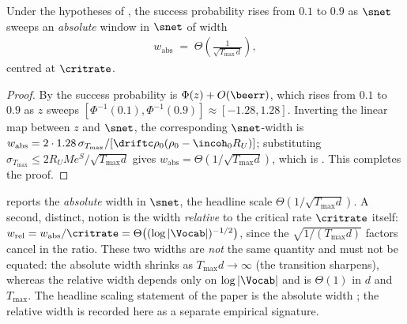 \begin{corollary}
\label{cor:R2_width}
Under the hypotheses of , the success probability rises from
$0.1$ to $0.9$ as $\snet$ sweeps an \emph{absolute} window in $\snet$ of
width
\begin{align}\label{eq:R2_width_abs}
   w_{\mathrm{abs}} \;=\; \Theta\!\left(\frac{1}{\sqrt{T_{\max}\,d}}\right),
\end{align}
centred at $\critrate$.
\end{corollary}

\begin{proof}
By  the success probability is $\Phi(z)+O(\beerr)$, which
rises from $0.1$ to $0.9$ as $z$ sweeps
$[\Phi^{-1}(0.1),\Phi^{-1}(0.9)]\approx[-1.28,1.28]$. Inverting the linear
map  between $z$ and $\snet$, the corresponding $\snet$-width
is $w_{\mathrm{abs}}=2\cdot1.28\,\sigma_{T_{\max}}/[\driftc\rho_0(\rho_0-\incoh_0 R_U)]$;
substituting $\sigma_{T_{\max}}\le2R_U M e^{S}/\sqrt{T_{\max}d}$ gives
$w_{\mathrm{abs}}=\Theta(1/\sqrt{T_{\max}d})$, which is
. This completes the proof.
\end{proof}

\begin{remark}
\label{rem:R2_width_relative}
 reports the \emph{absolute} width in $\snet$, the
headline scale $\Theta(1/\sqrt{T_{\max}d})$. A second, distinct, notion is
the width \emph{relative} to the critical rate $\critrate$ itself:
$w_{\mathrm{rel}}=w_{\mathrm{abs}}/\critrate=\Theta\bigl((\log|\Vocab|)^{-1/2}\bigr)$,
since the $\sqrt{1/(T_{\max}d)}$ factors cancel in the ratio. These two
widths are \emph{not} the same quantity and must not be equated: the
absolute width shrinks as $T_{\max}d\to\infty$ (the transition sharpens),
whereas the relative width depends only on $\log|\Vocab|$ and is
$\Theta(1)$ in $d$ and $T_{\max}$. The headline scaling statement of the
paper is the absolute width ; the relative width is
recorded here as a separate empirical signature.
\end{remark}
